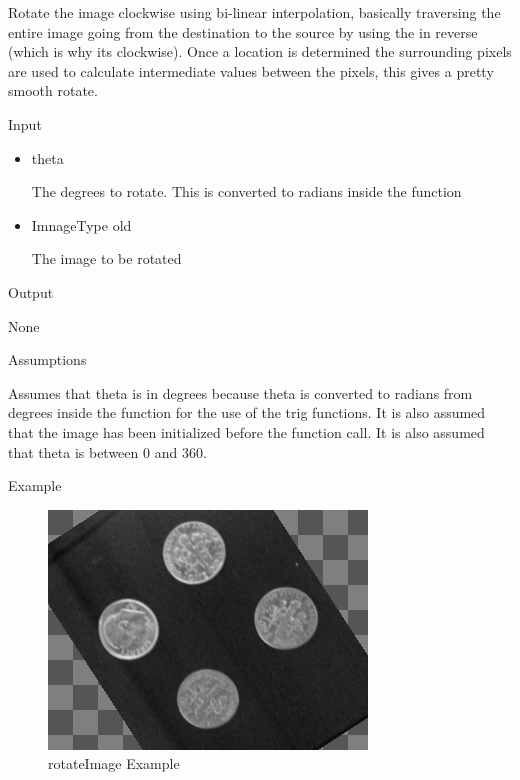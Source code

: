 \documentclass[pdftex, 11pt]{article}
\begin{document}
\begin{description}
\begin{description}
				Rotate the image clockwise using bi-linear
				interpolation, basically traversing
				the entire image going from the destination 
				to the source by using the
				in reverse (which is why its clockwise). 
				Once a location is determined the
				surrounding pixels are used to calculate 
				intermediate values between the
				pixels, this gives a pretty smooth rotate.

			\item{Input}

				\begin{itemize}

					\item{theta}

						The degrees to rotate. This is converted
						to radians inside the function

					\item{ImnageType old}

						The image to be rotated

				\end{itemize}

			\item{Output}

				None

			\item{Assumptions}

				Assumes that theta is in degrees because theta is
				converted to radians from degrees inside the function
				for the use of the trig functions.
				It is also assumed that the image has been initialized
				before the function call. It is also assumed that theta
				is between 0 and 360.

			\item{Example}

				\begin{figure}[p]
					\centering
					\caption{rotateImage Example}
				\includegraphics{images/outrotate.png}
			\end{figure}


\end{description}
\end{description}
\end{document}
